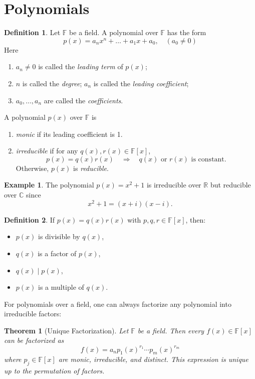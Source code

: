 \documentclass[11pt,openany]{book}
\theoremstyle{plain}
\newtheorem{theorem}{Theorem}[chapter]
\theoremstyle{definition}
\newtheorem{definition}[definition]{Definition}
\newtheorem{example}[example]{Example}
\theoremstyle{remark}
\begin{document}
\section{Polynomials}

\begin{definition}  
Let $\mathbb{F}$ be a field. A polynomial over $\mathbb{F}$ has the form
    \[
        p(x) = a_n x^n + \dots + a_1 x + a_0, \quad (a_0 \neq 0)
    \]
    Here
    \begin{enumerate}
    \item $a_n \neq 0$ is called the \textit{leading term} of $p(x)$; 
    \item $n$ is called the \textit{degree}; $a_n$ is called the \textit{leading coefficient}; 
    \item $a_0, \dots, a_n$ are called the \textit{coefficients}.
\end{enumerate}
    A polynomial $p(x)$ over $\mathbb{F}$ is 
\begin{enumerate}
    \item \textit{monic} if its leading coefficient is 1.

    \item \textit{irreducible} if for any $q(x), r(x) \in \mathbb{F}[x]$,
    \[
        p(x) = q(x)r(x) \quad \Rightarrow \quad q(x) \text{ or } r(x) \text{ is constant}.
    \]
    Otherwise, $p(x)$ is \textit{reducible}.
\end{enumerate}
\end{definition}

\begin{example}  
The polynomial $p(x) = x^2 + 1$ is irreducible over $\mathbb{R}$ but reducible over $\mathbb{C}$ since
\[
    x^2 + 1 = (x+i)(x-i).
\]
\end{example}

\begin{definition}  
If $p(x) = q(x)r(x)$ with $p,q,r \in \mathbb{F}[x]$, then:
\begin{itemize}
    \item $p(x)$ is divisible by $q(x)$,
    \item $q(x)$ is a factor of $p(x)$,
    \item $q(x) \mid p(x)$,
    \item $p(x)$ is a multiple of $q(x)$.
\end{itemize}
\end{definition}

For polynomials over a field, one can always factorize any polynomial into irreducible factors:
\begin{theorem} [Unique Factorization] 
Let $\mathbb{F}$ be a field. Then every $f(x) \in \mathbb{F}[x]$ can be factorized as
\[
    f(x) = a_n p_1(x)^{r_1} \cdots p_m(x)^{r_m}
\]
where $p_j \in \mathbb{F}[x]$ are monic, irreducible, and distinct. This expression is unique up to the permutation of factors.
\end{theorem}
\end{document}
